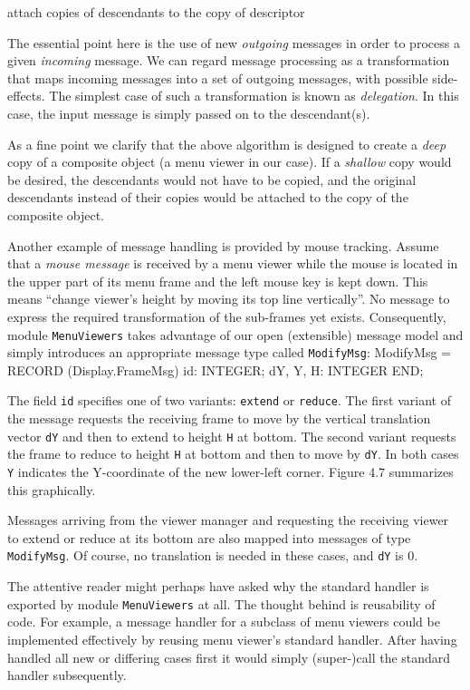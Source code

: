 attach copies of descendants to the copy of descriptor

\noindent The essential point here is the use of new {\it outgoing\/} messages in order
to process a given {\it incoming\/} message. We can regard message processing
as a transformation that maps incoming messages into a set of outgoing
messages, with possible side-effects. The simplest case of such a
transformation is known as {\it delegation\/}. In this case, the input message
is simply passed on to the descendant(s).

As a fine point we clarify that the above algorithm is designed to
create a {\it deep\/} copy of a composite object (a menu viewer in our
case). If a {\it shallow\/} copy would be desired, the descendants would not
have to be copied, and the original descendants instead of their
copies would be attached to the copy of the composite object.

Another example of message handling is provided by mouse
tracking. Assume that a {\it mouse message\/} is received by a menu viewer
while the mouse is located in the upper part of its menu frame and the
left mouse key is kept down. This means ``change viewer's height by
moving its top line vertically''. No message to express the required
transformation of the sub-frames yet exists. Consequently, module
{\tt MenuViewers\/} takes advantage of our open (extensible) message model and
simply introduces an appropriate message type called {\tt ModifyMsg\/}:
\begintt
ModifyMsg = RECORD (Display.FrameMsg)
  id: INTEGER;
  dY, Y, H: INTEGER
END;
\endtt

\noindent The field {\tt id\/} specifies one of two variants: {\tt extend\/} or {\tt reduce\/}. The
first variant of the message requests the receiving frame to move by
the vertical translation vector {\tt dY\/} and then to extend to height {\tt H\/} at
bottom. The second variant requests the frame to reduce to height {\tt H\/} at
bottom and then to move by {\tt dY\/}. In both cases {\tt Y\/} indicates the
Y-coordinate of the new lower-left corner. Figure 4.7 summarizes this
graphically.

Messages arriving from the viewer manager and requesting the receiving
viewer to extend or reduce at its bottom are also mapped into messages
of type {\tt ModifyMsg\/}. Of course, no translation is needed in these cases,
and {\tt dY\/} is 0.

The attentive reader might perhaps have asked why the standard handler
is exported by module {\tt MenuViewers\/} at all. The thought behind is
reusability of code. For example, a message handler for a subclass of
menu viewers could be implemented effectively by reusing menu viewer's
standard handler. After having handled all new or differing cases
first it would simply (super-)call the standard handler subsequently.

